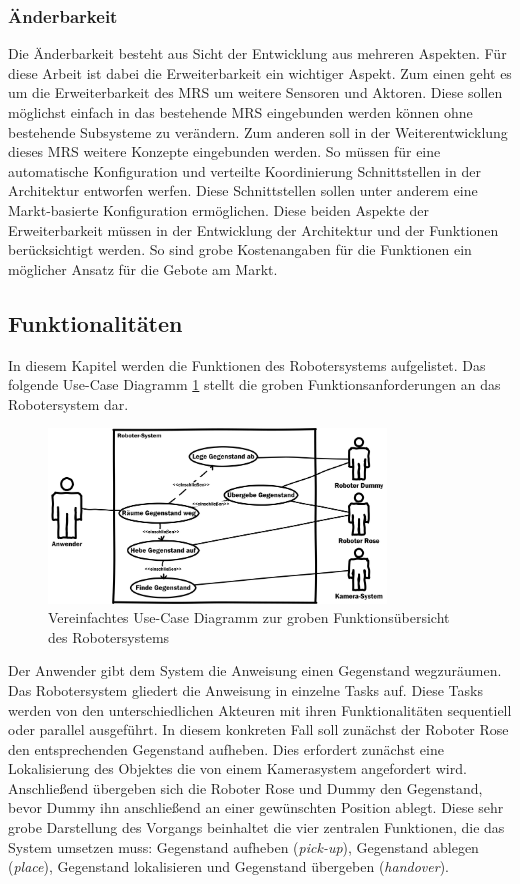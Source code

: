 \subsubsection{Änderbarkeit}
Die Änderbarkeit besteht aus Sicht der Entwicklung aus mehreren Aspekten. Für diese Arbeit ist dabei die Erweiterbarkeit ein wichtiger Aspekt. Zum einen geht es um die Erweiterbarkeit des MRS um weitere Sensoren und Aktoren. Diese sollen möglichst einfach in das bestehende MRS eingebunden werden können ohne bestehende Subsysteme zu verändern. Zum anderen soll in der Weiterentwicklung dieses MRS weitere Konzepte eingebunden werden. So müssen für eine automatische Konfiguration und verteilte Koordinierung Schnittstellen in der Architektur entworfen werfen. Diese Schnittstellen sollen unter anderem eine Markt-basierte Konfiguration ermöglichen. Diese beiden Aspekte der Erweiterbarkeit müssen in der Entwicklung der Architektur und der Funktionen berücksichtigt werden. So sind grobe Kostenangaben für die Funktionen ein möglicher Ansatz für die Gebote am Markt.

\subsection{Funktionalitäten}
\label{sec:dev-funk}

In diesem Kapitel werden die Funktionen des Robotersystems aufgelistet. Das folgende Use-Case Diagramm \ref{fig:dev-usecase} stellt die groben Funktionsanforderungen an das Robotersystem dar.

\begin{figure}[H]
	\centering
	\includegraphics[width=0.8\textwidth]{fig/UseCase}   
	\caption[Use-Case Robotersystem]{Vereinfachtes Use-Case Diagramm zur groben Funktionsübersicht des Robotersystems}
	\label{fig:dev-usecase}
\end{figure}

Der Anwender gibt dem System die Anweisung einen Gegenstand wegzuräumen. Das Robotersystem gliedert die Anweisung in einzelne Tasks auf. Diese Tasks werden von den unterschiedlichen Akteuren mit ihren Funktionalitäten sequentiell oder parallel ausgeführt. In diesem konkreten Fall soll zunächst der Roboter Rose den entsprechenden Gegenstand aufheben. Dies erfordert zunächst eine Lokalisierung des Objektes die von einem Kamerasystem angefordert wird. Anschließend übergeben sich die Roboter Rose und Dummy den Gegenstand, bevor Dummy ihn anschließend an einer gewünschten Position ablegt. Diese sehr grobe Darstellung des Vorgangs beinhaltet die vier zentralen Funktionen, die das System umsetzen muss: Gegenstand aufheben (\textit{pick-up}), Gegenstand ablegen (\textit{place}), Gegenstand lokalisieren und Gegenstand übergeben (\textit{handover}).

